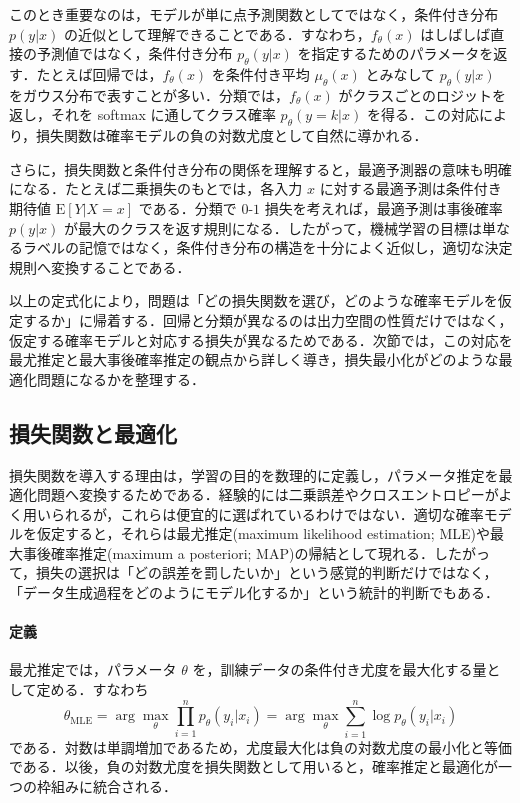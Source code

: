 このとき重要なのは，モデルが単に点予測関数としてではなく，条件付き分布 $p(y|x)$ の近似として理解できることである．すなわち，$f_\theta(x)$ はしばしば直接の予測値ではなく，条件付き分布 $p_\theta(y|x)$ を指定するためのパラメータを返す．たとえば回帰では，$f_\theta(x)$ を条件付き平均 $\mu_\theta(x)$ とみなして
$p_\theta(y|x)$ をガウス分布で表すことが多い．分類では，$f_\theta(x)$ がクラスごとのロジットを返し，それを softmax に通してクラス確率 $p_\theta(y=k|x)$ を得る．この対応により，損失関数は確率モデルの負の対数尤度として自然に導かれる．

さらに，損失関数と条件付き分布の関係を理解すると，最適予測器の意味も明確になる．たとえば二乗損失のもとでは，各入力 $x$ に対する最適予測は条件付き期待値 $\mathrm{E}[Y|X=x]$ である．分類で $0$-$1$ 損失を考えれば，最適予測は事後確率 $p(y|x)$ が最大のクラスを返す規則になる．したがって，機械学習の目標は単なるラベルの記憶ではなく，条件付き分布の構造を十分によく近似し，適切な決定規則へ変換することである．

以上の定式化により，問題は「どの損失関数を選び，どのような確率モデルを仮定するか」に帰着する．回帰と分類が異なるのは出力空間の性質だけではなく，仮定する確率モデルと対応する損失が異なるためである．次節では，この対応を最尤推定と最大事後確率推定の観点から詳しく導き，損失最小化がどのような最適化問題になるかを整理する．

\subsection{損失関数と最適化}
損失関数を導入する理由は，学習の目的を数理的に定義し，パラメータ推定を最適化問題へ変換するためである．経験的には二乗誤差やクロスエントロピーがよく用いられるが，これらは便宜的に選ばれているわけではない．適切な確率モデルを仮定すると，それらは最尤推定(maximum likelihood estimation; MLE)や最大事後確率推定(maximum a posteriori; MAP)の帰結として現れる．したがって，損失の選択は「どの誤差を罰したいか」という感覚的判断だけではなく，「データ生成過程をどのようにモデル化するか」という統計的判断でもある．

\paragraph*{定義}
最尤推定では，パラメータ $\theta$ を，訓練データの条件付き尤度を最大化する量として定める．すなわち
\begin{equation}
\hat\theta_{\mathrm{MLE}}
= \arg\max_\theta \prod_{i=1}^n p_\theta(y_i|x_i)
= \arg\max_\theta \sum_{i=1}^n \log p_\theta(y_i|x_i)
\end{equation}
である．対数は単調増加であるため，尤度最大化は負の対数尤度の最小化と等価である．以後，負の対数尤度を損失関数として用いると，確率推定と最適化が一つの枠組みに統合される．

